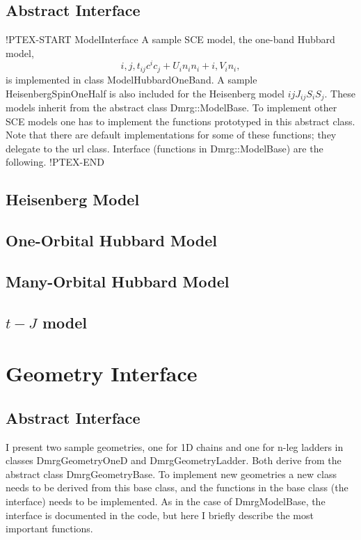 \documentclass[paper=letter]{scrartcl}
\newcommand{\cppClass}[1]{{\sffamily #1}}
\begin{document}
\subsection{Abstract Interface}
!PTEX-START ModelInterface A sample SCE model, the one-band Hubbard model, \[ {i,j,}t_{ij}c^{i} c_{j} + U_i n_{i}n_{i} + {i,}V_i n_{i}, \] is implemented in class {ModelHubbardOneBand}. A sample {HeisenbergSpinOneHalf} is also included for the Heisenberg model ${ij}J_{ij}{S}_i{S}_j$. These models inherit from the abstract class {Dmrg::ModelBase}. To implement other SCE models one has to implement the functions prototyped in this abstract class. Note that there are default implementations for some of these functions; they delegate to the {url} class. Interface (functions in {Dmrg::ModelBase}) are the following. !PTEX-END

\subsection{Heisenberg Model}
\subsection{One-Orbital Hubbard Model}
\subsection{Many-Orbital Hubbard Model}
\subsection{$t-J$ model}

\section{Geometry Interface} \label{subsec:geometries}
\subsection{Abstract Interface}
I present two sample geometries, one for 1D chains and one for n-leg ladders in classes \cppClass{DmrgGeometryOneD}
 and \cppClass{DmrgGeometryLadder}.
Both derive from the abstract class \cppClass{DmrgGeometryBase}.
To implement new geometries a new class needs to be derived from this base class,
and the functions in the base class (the interface) needs to be implemented. 
As in the case of \cppClass{DmrgModelBase}, the interface is documented in the code, but here I briefly describe the most important functions.
\end{document}
